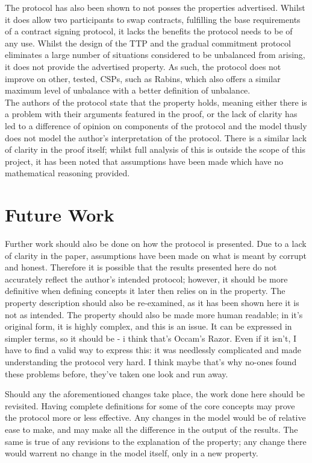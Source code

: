\documentclass{l4proj}
\begin{document}
The protocol has also been shown to not posses the properties advertised. Whilst it does allow two participants to swap contracts, fulfilling the base requirements of a contract signing protocol, it lacks the benefits the protocol needs to be of any use. Whilst the design of the TTP and the gradual commitment protocol eliminates a large number of situations considered to be unbalanced from arising, it does not provide the advertised property. As such, the protocol does not improve on other, tested, CSPs, such as Rabins, which also offers a similar maximum level of unbalance with a better definition of unbalance.\\
The authors of the protocol state that the property holds, meaning either there is a problem with their arguments featured in the proof, or the lack of clarity has led to a difference of opinion on components of the protocol and the model thusly does not model the author's interpretation of the protocol.
There is a similar lack of clarity in the proof itself; whilst full analysis of this is outside the scope of this project, it has been noted that assumptions have been made which have no mathematical reasoning provided.


\section{Future Work}


Further work should also be done on how the protocol is presented. Due to a lack of clarity in the paper, assumptions have been made on what is meant by corrupt and honest. Therefore it is possible that the results presented here do not accurately reflect the author's intended protocol; however, it should be more definitive when defining concepts it later then relies on in the property. The property description should also be re-examined, as it has been shown here it is not as intended. The property should also be made more human readable; in it's original form, it is highly complex, and this is an issue. It can be expressed in simpler terms, so it should be - i think that's Occam's Razor. Even if it isn't, I have to find a valid way to express this: it was needlessly complicated and made understanding the protocol very hard. I think maybe that's why no-ones found these problems before, they've taken one look and run away.

Should any the aforementioned changes take place, the work done here should be revisited. Having complete definitions for some of the core concepts may prove the protocol more or less effective. Any changes in the model would be of relative ease to make, and may make all the difference in the output of the results. The same is true of any revisions to the explanation of the property; any change there would warrent no change in the model itself, only in a new property.
\end{document}
